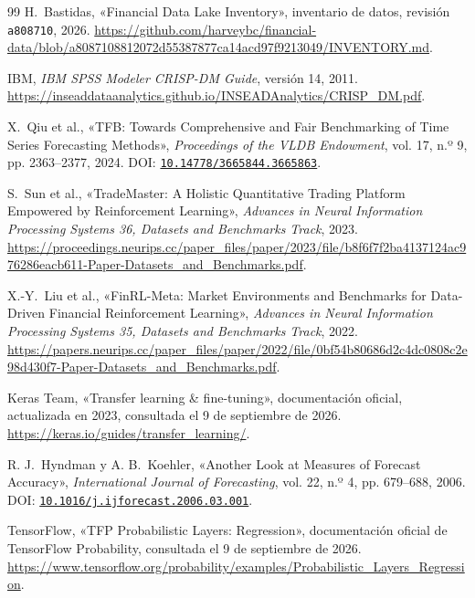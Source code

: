 \documentclass[11pt,letterpaper]{article}
\begin{document}
\begin{thebibliography}{99}
H.~Bastidas, «Financial Data Lake Inventory», inventario de datos, revisión \texttt{a808710}, 2026. \url{https://github.com/harveybc/financial-data/blob/a8087108812072d55387877ca14acd97f9213049/INVENTORY.md}.


IBM, \emph{IBM SPSS Modeler CRISP-DM Guide}, versión 14, 2011. \url{https://inseaddataanalytics.github.io/INSEADAnalytics/CRISP_DM.pdf}.

X.~Qiu et al., «{TFB}: Towards Comprehensive and Fair Benchmarking of Time Series Forecasting Methods», \emph{Proceedings of the VLDB Endowment}, vol. 17, n.º 9, pp. 2363--2377, 2024. DOI: \href{https://doi.org/10.14778/3665844.3665863}{\nolinkurl{10.14778/3665844.3665863}}.

S.~Sun et al., «{TradeMaster}: A Holistic Quantitative Trading Platform Empowered by Reinforcement Learning», \emph{Advances in Neural Information Processing Systems 36, Datasets and Benchmarks Track}, 2023. \url{https://proceedings.neurips.cc/paper_files/paper/2023/file/b8f6f7f2ba4137124ac976286eacb611-Paper-Datasets_and_Benchmarks.pdf}.

X.-Y.~Liu et al., «{FinRL-Meta}: Market Environments and Benchmarks for Data-Driven Financial Reinforcement Learning», \emph{Advances in Neural Information Processing Systems 35, Datasets and Benchmarks Track}, 2022. \url{https://papers.neurips.cc/paper_files/paper/2022/file/0bf54b80686d2c4dc0808c2e98d430f7-Paper-Datasets_and_Benchmarks.pdf}.

Keras Team, «Transfer learning \& fine-tuning», documentación oficial, actualizada en 2023, consultada el 9 de septiembre de 2026. \url{https://keras.io/guides/transfer_learning/}.

R. J.~Hyndman y A. B.~Koehler, «Another Look at Measures of Forecast Accuracy», \emph{International Journal of Forecasting}, vol. 22, n.º 4, pp. 679--688, 2006. DOI: \href{https://doi.org/10.1016/j.ijforecast.2006.03.001}{\nolinkurl{10.1016/j.ijforecast.2006.03.001}}.

TensorFlow, «TFP Probabilistic Layers: Regression», documentación oficial de TensorFlow Probability, consultada el 9 de septiembre de 2026. \url{https://www.tensorflow.org/probability/examples/Probabilistic_Layers_Regression}.
\end{thebibliography}
\end{document}
